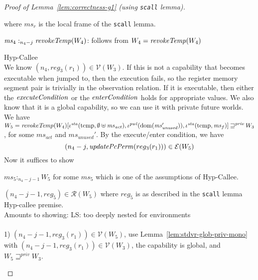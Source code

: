 \documentclass[a4paper]{article}
\DeclareMathOperator{\dom}{dom}
\newcommand\lau[1]{{\color{purple} \sf \footnotesize {LS: #1}}\\}
\newcommand{\var}[1]{\mathit{#1}}
\newcommand{\hs}{\var{ms}}
\newcommand{\ms}{\hs}
\newcommand{\reg}{\var{reg}}
\newcommand{\heap}{\var{mem}}
\newcommand{\pwl}{\var{pwl}}
\newcommand{\sta}{\var{sta}}
\newcommand{\unused}{\var{unused}}
\newcommand{\act}{\var{act}}
\newcommand{\plainfun}[2]{
  \ifthenelse{\equal{#2}{}}
  {\mathit{#1}}
  {\mathit{#1}(#2)}
}
\newcommand{\updatePcPerm}[1]{\plainfun{updatePcPerm}{#1}}
\newcommand{\execCond}[1]{\plainfun{executeCondition}{#1}}
\newcommand{\entryCond}[1]{\plainfun{enterCondition}{#1}}
\newcommand{\revokeTemp}[1]{\plainfun{revokeTemp}{#1}}
\newcommand{\futurestr}{\mathbin{\sqsupseteq}^{\var{priv}}}
\newcommand{\heapSat}[3][\heap]{#1 :_{#2} #3}
\newcommand{\memSat}[3][n]{\heapSat[#2]{#1}{#3}}
\newcommand{\asmType}{\plaindom{AsmType}}
\newcommand{\plaindom}[1]{\mathrm{#1}}
\newcommand{\intr}[2]{\mathcal{#1}}
\newcommand{\valueintr}[1]{\intr{V}{#1}}
\newcommand{\exprintr}[1]{\intr{E}{#1}}
\newcommand{\regintr}[1]{\intr{R}{#1}}
\newcommand{\stdvr}{\valueintr{\asmType}}
\newcommand{\stder}{\exprintr{\asmType}}
\newcommand{\stdrr}{\regintr{\asmType}}
\newcommand{\npair}[2][n]{\left(#1,#2 \right)}
\newcommand{\plainview}[1]{\mathrm{#1}}
\newcommand{\temp}{\plainview{temp}}
\begin{document}
\begin{proof}[Proof of Lemma~\ref{lem:correctness-g1} (using \texttt{scall} lemma)]
\begin{enumproof}[resume]
\begin{enumproof}
\begin{enumproof}
\begin{enumproof}
                  where $\ms_r$ is the local frame of the \texttt{scall} lemma.
                  \begin{enumproof}
                    \item $\memSat[n_4-j]{\ms_4}{\revokeTemp{W_4}}$: follows from $W_4 = \revokeTemp{W_4}$
                    \item Hyp-Callee\\
                      We know $\npair[n_4]{\reg_3(r_1)} \in \stdvr(W_3)$. If this is not a capability that becomes executable when jumped to, then the execution fails, so the register memory segment pair is trivially in the observation relation. If it is executable, then either the $\execCond{}$ or the $\entryCond{}$ holds for appropriate values. We also know that it is a global capability, so we can use it with private future worlds. We have $W_5 = \revokeTemp{W_4}[\iota^\sta (\temp,\emptyset \uplus \ms_\act),\iota^\pwl(\dom(\ms_\unused')),\iota^\sta(\temp,\ms_f)] \futurestr W_3$, for some $\ms_\act$ and $\ms_\unused'$. By the execute/enter condition, we have
                      \[
                        \npair[n_4-j]{\updatePcPerm{reg_3(r_1)}} \in \stder(W_5)
                      \]
                      Now it suffices to show
                      \begin{enumproof}
                        \item $\memSat[n_4-j-1]{\ms_5}{W_5}$ for some $\ms_5$ which is one of the assumptions of Hyp-Callee.
                        \item $\npair[n_4-j-1]{\reg_5} \in \stdrr(W_5)$ where $\reg_5$ is as described in the \texttt{scall} lemma Hyp-callee premise.\\
                          Amounts to showing:\lau{too deeply nested for environments}\\
                          1) $\npair[n_4-j-1]{\reg_3(r_1)} \in \stdvr(W_5)$, use Lemma~\ref{lem:stdvr-glob-priv-mono} with $\npair[n_4-j-1]{\reg_3(r_1)} \in \stdvr(W_3)$, the capability is global, and $W_5 \futurestr W_3$.


\end{enumproof}
\end{enumproof}
\end{enumproof}
\end{enumproof}
\end{enumproof}
\end{enumproof}
\end{proof}
\end{document}

